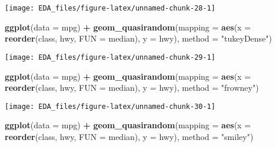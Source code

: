 \documentclass[]{book}
\newenvironment{Shaded}{\begin{snugshade}}{\end{snugshade}}
\newcommand{\DataTypeTok}[1]{\textcolor[rgb]{0.13,0.29,0.53}{#1}}
\newcommand{\KeywordTok}[1]{\textcolor[rgb]{0.13,0.29,0.53}{\textbf{#1}}}
\newcommand{\NormalTok}[1]{#1}
\newcommand{\OperatorTok}[1]{\textcolor[rgb]{0.81,0.36,0.00}{\textbf{#1}}}
\newcommand{\StringTok}[1]{\textcolor[rgb]{0.31,0.60,0.02}{#1}}
\theoremstyle{plain}
\theoremstyle{remark}
\begin{document}
\begin{center}\texttt{[image: EDA\_files/figure-latex/unnamed-chunk-28-1]} \end{center}

\begin{Shaded}
\begin{Highlighting}[]
\KeywordTok{ggplot}\NormalTok{(}\DataTypeTok{data =}\NormalTok{ mpg) }\OperatorTok{+}
\StringTok{  }\KeywordTok{geom_quasirandom}\NormalTok{(}\DataTypeTok{mapping =} \KeywordTok{aes}\NormalTok{(}\DataTypeTok{x =} \KeywordTok{reorder}\NormalTok{(class, hwy, }\DataTypeTok{FUN =}\NormalTok{ median),}
                                 \DataTypeTok{y =}\NormalTok{ hwy),}
                   \DataTypeTok{method =} \StringTok{"tukeyDense"}\NormalTok{)}
\end{Highlighting}
\end{Shaded}

\begin{center}\texttt{[image: EDA\_files/figure-latex/unnamed-chunk-29-1]} \end{center}

\begin{Shaded}
\begin{Highlighting}[]
\KeywordTok{ggplot}\NormalTok{(}\DataTypeTok{data =}\NormalTok{ mpg) }\OperatorTok{+}
\StringTok{  }\KeywordTok{geom_quasirandom}\NormalTok{(}\DataTypeTok{mapping =} \KeywordTok{aes}\NormalTok{(}\DataTypeTok{x =} \KeywordTok{reorder}\NormalTok{(class, hwy, }\DataTypeTok{FUN =}\NormalTok{ median),}
                                 \DataTypeTok{y =}\NormalTok{ hwy),}
                   \DataTypeTok{method =} \StringTok{"frowney"}\NormalTok{)}
\end{Highlighting}
\end{Shaded}

\begin{center}\texttt{[image: EDA\_files/figure-latex/unnamed-chunk-30-1]} \end{center}

\begin{Shaded}
\begin{Highlighting}[]
\KeywordTok{ggplot}\NormalTok{(}\DataTypeTok{data =}\NormalTok{ mpg) }\OperatorTok{+}
\StringTok{  }\KeywordTok{geom_quasirandom}\NormalTok{(}\DataTypeTok{mapping =} \KeywordTok{aes}\NormalTok{(}\DataTypeTok{x =} \KeywordTok{reorder}\NormalTok{(class, hwy, }\DataTypeTok{FUN =}\NormalTok{ median),}
                                 \DataTypeTok{y =}\NormalTok{ hwy),}
                   \DataTypeTok{method =} \StringTok{"smiley"}\NormalTok{)}
\end{Highlighting}
\end{Shaded}
\end{document}
